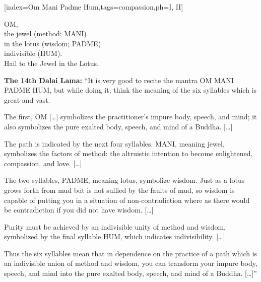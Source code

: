 [index={Om Mani Padme Hum},tags={compassion},ph={I, II}]
  \vspace{1em}
  {\small{}}
  \vspace{-2em}
  \begin{feeler}
    OM,\\
    the jewel (method; MANI)\\
    in the lotus (wisdom; PADME)\\
    indivisible (HUM).\\\vspace{1em}
    Hail to the Jewel in the Lotus.
  \end{feeler}
  \begin{explanation}
    \textbf{The 14th Dalai Lama:} ``It is very good to recite the mantra OM
    MANI PADME HUM, but while doing it, think the meaning of the six syllables
    which is great and vast.
    \par
    The first, OM [\ldots] symbolizes the practitioner's impure body, speech,
    and mind; it also symbolizes the pure exalted body, speech, and mind of a
    Buddha. [\ldots]
    \par
    The path is indicated by the next four syllables. MANI, meaning jewel,
    symbolizes the factors of method: the altruistic intention to become
    enlightened, compassion, and love. [\ldots]
    \par
    The two syllables, PADME, meaning lotus, symbolize wisdom. Just as a lotus
    grows forth from mud but is not sullied by the faults of mud, so wisdom is
    capable of putting you in a situation of non-contradiction where as there
    would be contradiction if you did not have wisdom. [\ldots]
    \par
    Purity must be achieved by an indivisible unity of method and wisdom,
    symbolized by the final syllable HUM, which indicates indivisibility. [\ldots]
    \par
    Thus the six syllables mean that in dependence on the practice of a path
    which is an indivisible union of method and wisdom, you can transform your
    impure body, speech, and mind into the pure exalted body, speech, and mind
    of a Buddha. [\ldots]''
  \end{explanation}
\endsong


